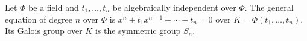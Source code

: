 Let $\Phi$ be a field and $t_1, \ldots, t_n$ be algebraically independent over $\Phi$. The general equation of degree $n$ over $\Phi$ is $x^n + t_1 x^{n-1} + \cdots + t_n = 0$ over $K = \Phi(t_1, \ldots, t_n)$. Its Galois group over $K$ is the symmetric group $S_n$.
